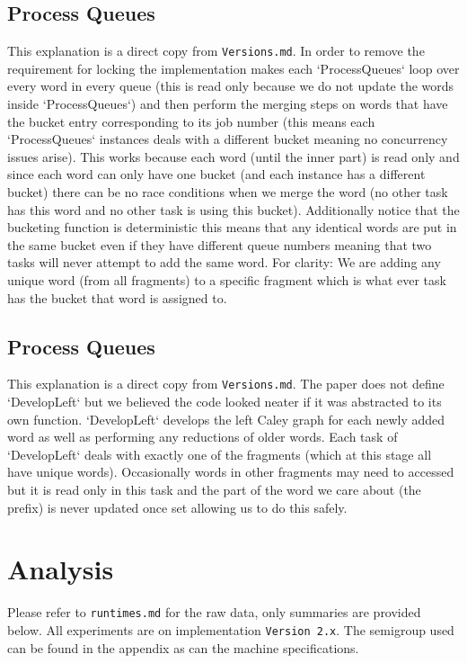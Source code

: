 \documentclass{report}
\begin{document}
\subsection*{Process Queues}
This explanation is a direct copy from \texttt{Versions.md}. 
\newline
In order to remove the requirement for locking the implementation makes each `ProcessQueues` loop over every word in every queue (this is read only because we do not update the words inside `ProcessQueues`) and then perform the merging steps on words that have the bucket entry corresponding to its job number (this means each `ProcessQueues` instances deals with a different bucket meaning no concurrency issues arise). This works because each word (until the inner part) is read only and since each word can only have one bucket (and each instance has a different bucket) there can be no race conditions when we merge the word (no other task has this word and no other task is using this bucket). Additionally notice that the bucketing function is deterministic this means that any identical words are put in the same bucket even if they have different queue numbers meaning that two tasks will never attempt to add the same word.
For clarity: We are adding any unique word (from all fragments) to a specific fragment which is what ever task has the bucket that word is assigned to.

\subsection*{Process Queues}
This explanation is a direct copy from \texttt{Versions.md}. 
\newline
The paper does not define `DevelopLeft` but we believed the code looked neater if it was abstracted to its own function. `DevelopLeft` develops the left Caley graph for each newly added word as well as performing any reductions of older words. Each task of `DevelopLeft` deals with exactly one of the fragments (which at this stage all have unique words). Occasionally words in other fragments may need to accessed but it is read only in this task and the part of the word we care about (the prefix) is never updated once set allowing us to do this safely.
\section*{Analysis}
Please refer to \texttt{runtimes.md} for the raw data, only summaries are provided below.
\newline
All experiments are on implementation \texttt{Version 2.x}.
\newline
The semigroup used can be found in the appendix as can the machine specifications. 
\end{document}
